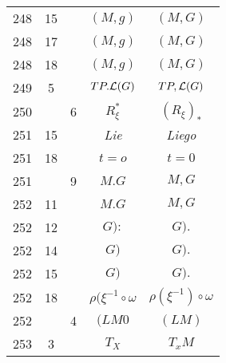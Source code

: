 \documentclass[a4paper,11pt]{article}
\begin{document}
\begin{center}
\begin{tabular}{|c|c|c|c|c|}
    248 & 15 & & $( M, g )$ & $( M, G )$ \\
    248 & 17 & & $( M, g )$ & $( M, G )$ \\
    248 & 18 & & $( M, g )$ & $( M, G )$ \\
    249 & \hphantom{0}5 & & $TP.\mathcal{L}( G )$ & $TP, \mathcal{L}( G )$ \\
    250 & & \hphantom{0}6 & $R_{ \xi }^{ * }$ & $( R_{ \xi } )_{ * }$ \\
    251 & 15 & & \textit{Lie} & \textit{Liego} \\
    251 & 18 & & $t = o$ & $t = 0$ \\
    251 & & \hphantom{0}9 & $M.G$ & $M, G$ \\
    252 & 11 & & $M.G$ & $M, G$ \\
    252 & 12 & & $G):$ & $G).$ \\
    252 & 14 & & $G)$ & $G).$ \\
    252 & 15 & & $G)$ & $G).$ \\
    252 & 18 & & $\rho( \xi^{ -1 } \circ \omega$
           & $\rho( \xi^{ -1 } ) \circ \omega$ \\
    252 & & \hphantom{0}4 & $( LM 0$ & $( LM )$ \\
    253 & \hphantom{0}3 & & $T_{ X }$ & $T_{ x }M$ \\
    \hline
  \end{tabular}





  \newpage


\end{center}
\end{document}
